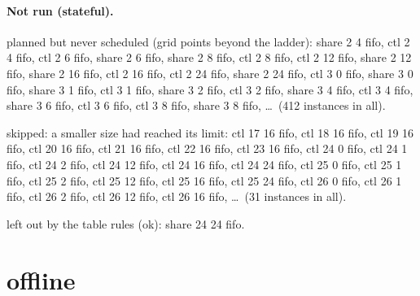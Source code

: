 \documentclass[10pt]{article}
\begin{document}
\paragraph{Not run (stateful).}
planned but never scheduled (grid points beyond the ladder): share 2 4 fifo, ctl 2 4 fifo, ctl 2 6 fifo, share 2 6 fifo, share 2 8 fifo, ctl 2 8 fifo, ctl 2 12 fifo, share 2 12 fifo, share 2 16 fifo, ctl 2 16 fifo, ctl 2 24 fifo, share 2 24 fifo, ctl 3 0 fifo, share 3 0 fifo, share 3 1 fifo, ctl 3 1 fifo, share 3 2 fifo, ctl 3 2 fifo, share 3 4 fifo, ctl 3 4 fifo, share 3 6 fifo, ctl 3 6 fifo, ctl 3 8 fifo, share 3 8 fifo, \ldots\ (412 instances in all).\par
skipped: a smaller size had reached its limit: ctl 17 16 fifo, ctl 18 16 fifo, ctl 19 16 fifo, ctl 20 16 fifo, ctl 21 16 fifo, ctl 22 16 fifo, ctl 23 16 fifo, ctl 24 0 fifo, ctl 24 1 fifo, ctl 24 2 fifo, ctl 24 12 fifo, ctl 24 16 fifo, ctl 24 24 fifo, ctl 25 0 fifo, ctl 25 1 fifo, ctl 25 2 fifo, ctl 25 12 fifo, ctl 25 16 fifo, ctl 25 24 fifo, ctl 26 0 fifo, ctl 26 1 fifo, ctl 26 2 fifo, ctl 26 12 fifo, ctl 26 16 fifo, \ldots\ (31 instances in all).\par
left out by the table rules (ok): share 24 24 fifo.\par
\section*{offline}
\end{document}
